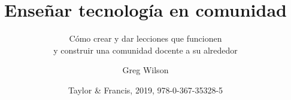 \documentclass[]{../tex/krantz}
\begin{document}
\title{Enseñar tecnología en comunidad}
\subtitle{Cómo crear y dar lecciones que funcionen \\ y construir una comunidad docente a su alrededor}
\author{Greg Wilson}
\date{Taylor \& Francis, 2019, 978-0-367-35328-5}
\maketitle

\frontmatter
\tableofcontents



\mainmatter
















\cleardoublepage

\printbibliography

\appendix










\printindex
\end{document}
